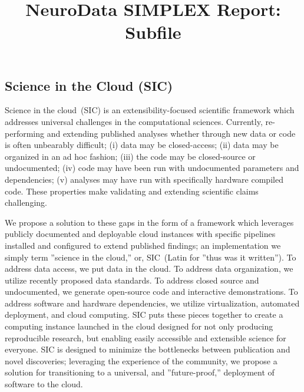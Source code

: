 \documentclass[simplex.tex]{subfiles}
\title{NeuroData SIMPLEX Report: Subfile}
\begin{document}

\subsection{Science in the Cloud (SIC)}

Science in the cloud~(SIC) is an extensibility-focused scientific framework which addresses universal
challenges in the computational sciences. Currently, re-performing and extending published analyses
whether through new data or code is often unbearably difficult; (i) data may be closed-access; (ii) data 
may be organized in an ad hoc fashion; (iii) the code may be closed-source or undocumented; (iv) code may
have been run with undocumented parameters and dependencies; (v) analyses may have run with specifically
hardware compiled code. These properties make validating and extending scientific claims challenging.

We propose a solution to these gaps in the form of a framework which leverages publicly documented and deployable
cloud instances with specific pipelines installed and configured to extend published findings; an implementation we
simply term ''science in the cloud,'' or, SIC~(Latin for ''thus was it written'').
To address data access, we put data in the cloud.
To address data organization, we utilize recently proposed data standards.
To address closed source and undocumented, we generate open-source code and interactive demonstrations.
To address software and hardware dependencies, we utilize virtualization, automated deployment, and cloud computing.
SIC puts these pieces together to create a computing instance launched in the cloud designed for not only
producing reproducible research, but enabling easily accessible and extensible science for everyone. SIC is designed
to minimize the bottlenecks between publication and novel discoveries; leveraging the experience of the community,
we propose a solution for transitioning to a universal, and ''future-proof,'' deployment of software to the cloud.
\end{document}
